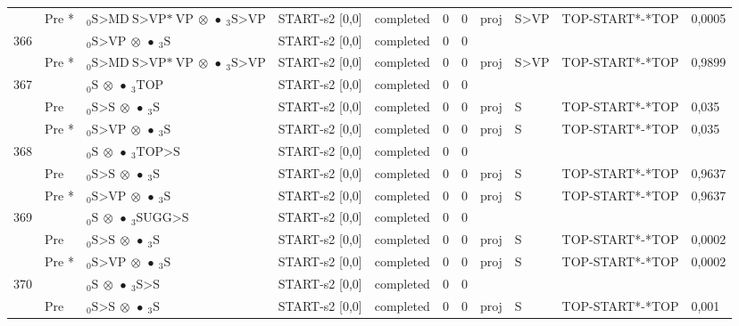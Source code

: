 \documentclass[10pt]{article}
\begin{document}
\begin{longtable}[htbp]{lllllllllll}
 & Pre *& $ {}_0 \textrm{S>MD} \ \textrm{S>VP*} \ \textrm{VP} \  \otimes \  \bullet \ {}_{3} \textrm{S>VP} $ & START-s2 [0,0] & completed & 0 & 0 & proj & S>VP & TOP-START*-*TOP & 0,0005 \\ 
366 & & $ {}_0 \textrm{S>VP} \  \otimes \  \bullet \ {}_{3} \textrm{S} $ & START-s2 [0,0] & completed & 0 & 0 & & & & \\ 
 & Pre *& $ {}_0 \textrm{S>MD} \ \textrm{S>VP*} \ \textrm{VP} \  \otimes \  \bullet \ {}_{3} \textrm{S>VP} $ & START-s2 [0,0] & completed & 0 & 0 & proj & S>VP & TOP-START*-*TOP & 0,9899 \\ 
367 & & $ {}_0 \textrm{S} \  \otimes \  \bullet \ {}_{3} \textrm{TOP} $ & START-s2 [0,0] & completed & 0 & 0 & & & & \\ 
 & Pre & $ {}_0 \textrm{S>S} \  \otimes \  \bullet \ {}_{3} \textrm{S} $ & START-s2 [0,0] & completed & 0 & 0 & proj & S & TOP-START*-*TOP & 0,035 \\ 
 & Pre *& $ {}_0 \textrm{S>VP} \  \otimes \  \bullet \ {}_{3} \textrm{S} $ & START-s2 [0,0] & completed & 0 & 0 & proj & S & TOP-START*-*TOP & 0,035 \\ 
368 & & $ {}_0 \textrm{S} \  \otimes \  \bullet \ {}_{3} \textrm{TOP>S} $ & START-s2 [0,0] & completed & 0 & 0 & & & & \\ 
 & Pre & $ {}_0 \textrm{S>S} \  \otimes \  \bullet \ {}_{3} \textrm{S} $ & START-s2 [0,0] & completed & 0 & 0 & proj & S & TOP-START*-*TOP & 0,9637 \\ 
 & Pre *& $ {}_0 \textrm{S>VP} \  \otimes \  \bullet \ {}_{3} \textrm{S} $ & START-s2 [0,0] & completed & 0 & 0 & proj & S & TOP-START*-*TOP & 0,9637 \\ 
369 & & $ {}_0 \textrm{S} \  \otimes \  \bullet \ {}_{3} \textrm{SUGG>S} $ & START-s2 [0,0] & completed & 0 & 0 & & & & \\ 
 & Pre & $ {}_0 \textrm{S>S} \  \otimes \  \bullet \ {}_{3} \textrm{S} $ & START-s2 [0,0] & completed & 0 & 0 & proj & S & TOP-START*-*TOP & 0,0002 \\ 
 & Pre *& $ {}_0 \textrm{S>VP} \  \otimes \  \bullet \ {}_{3} \textrm{S} $ & START-s2 [0,0] & completed & 0 & 0 & proj & S & TOP-START*-*TOP & 0,0002 \\ 
370 & & $ {}_0 \textrm{S} \  \otimes \  \bullet \ {}_{3} \textrm{S>S} $ & START-s2 [0,0] & completed & 0 & 0 & & & & \\ 
 & Pre & $ {}_0 \textrm{S>S} \  \otimes \  \bullet \ {}_{3} \textrm{S} $ & START-s2 [0,0] & completed & 0 & 0 & proj & S & TOP-START*-*TOP & 0,001 \\ 

\end{longtable}
\end{document}
